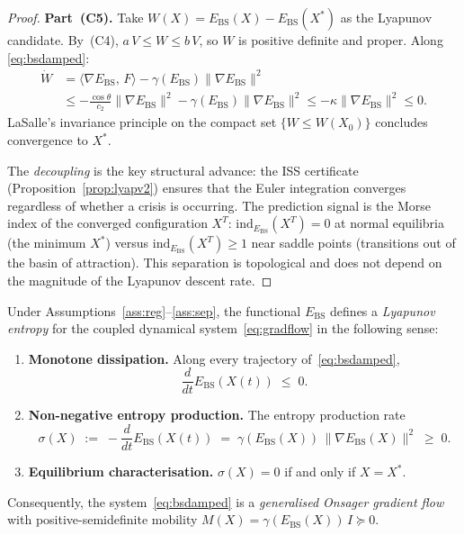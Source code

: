 \documentclass[final]{siamltex}
\newcommand{\norm}[1]{\lVert #1 \rVert}
\newcommand{\inner}[2]{\langle #1,\, #2 \rangle}
\providecommand{\grad}{\nabla}
\newcommand{\Ebs}{E_{\mathrm{BS}}}
\newcommand{\Xst}{X^*}
\newcommand{\costheta}{\cos\theta}
\begin{document}
\begin{proof}
\textbf{Part~(C5).} Take $W(X)=\Ebs(X)-\Ebs(\Xst)$ as the
Lyapunov candidate. By~(C4), $a\,V\le W\le b\,V$, so $W$ is
positive definite and proper. Along \eqref{eq:bsdamped}:
\begin{align*}
  \dot{W} &= \inner{\grad\Ebs}{F} - \gamma(\Ebs)\norm{\grad\Ebs}^2 \\
  &\le -\frac{\costheta}{c_2}\norm{\grad\Ebs}^2
  - \gamma(\Ebs)\norm{\grad\Ebs}^2
  \le -\kappa\norm{\grad\Ebs}^2 \le 0.
\end{align*}
LaSalle's invariance principle \cite{lasalle1960} on the compact
set $\{W\le W(X_0)\}$ concludes convergence to $\Xst$.

The \emph{decoupling} is the key structural advance: the ISS
certificate (Proposition~\ref{prop:lyapv2}) ensures that the
Euler integration converges regardless of whether a crisis is
occurring.  The prediction signal is the Morse index of the
converged configuration $X^T$: $\mathrm{ind}_{\Ebs}(X^T) = 0$
at normal equilibria (the minimum $\Xst$) versus
$\mathrm{ind}_{\Ebs}(X^T) \ge 1$ near saddle points
(transitions out of the basin of attraction).  This separation
is topological and does not depend on the magnitude of the
Lyapunov descent rate.
\end{proof}

\begin{theorem}\label{thm:entropy}
Under Assumptions~\ref{ass:reg}--\ref{ass:sep}, the functional
$\Ebs$ defines a \emph{Lyapunov entropy} for the coupled dynamical
system~\eqref{eq:gradflow} in the following sense:
\begin{enumerate}
\item[\textup{(E1)}] \textbf{Monotone dissipation.}
  Along every trajectory of~\eqref{eq:bsdamped},
  \[
    \frac{d}{dt}\Ebs(X(t)) \;\le\; 0.
  \]
\item[\textup{(E2)}] \textbf{Non-negative entropy production.}
  The entropy production rate
  \[
    \sigma(X) \;:=\; -\frac{d}{dt}\Ebs(X(t))
    \;=\; \gamma(\Ebs(X))\,\norm{\grad\Ebs(X)}^2 \;\ge\; 0.
  \]
\item[\textup{(E3)}] \textbf{Equilibrium characterisation.}
  $\sigma(X) = 0$ if and only if $X = \Xst$.
\end{enumerate}
Consequently, the system~\eqref{eq:bsdamped} is a
\emph{generalised Onsager gradient flow} with positive-semidefinite
mobility $M(X) = \gamma(\Ebs(X))\,I \succeq 0$.
\end{theorem}
\end{document}
